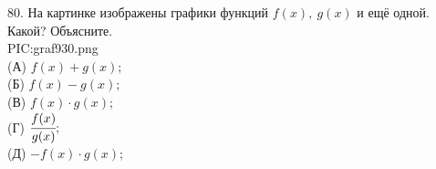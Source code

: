 80. На картинке изображены графики функций $f(x),\ g(x)$ и ещё одной. Какой?
Объясните.\\
{{PIC:graf930.png}}\\
(А) $f(x)+g(x);$\\
(Б) $f(x)-g(x);$\\
(В) $f(x)\cdot g(x);$\\
(Г) $\cfrac{f(x)}{g(x)};$\\
(Д) $-f(x)\cdot g(x);$\\
